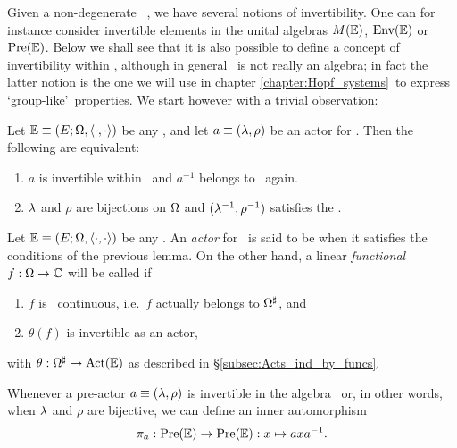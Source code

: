 Given a non-degenerate \context\ \EE, we have several notions
of invertibility. One can for instance consider invertible elements
in the unital algebras $M(\mathbb{E})$, $\mbox{\rm Env}(\mathbb{E})$ or $\mbox{\rm Pre}(\mathbb{E})$\@.
Below we shall see that it is also possible to define a concept of invertibility within \ActE,
although in general \ActE\ is not really an algebra;
in fact the latter notion is the one we will use in
chapter \ref{chapter:Hopf_systems}\ to express \lq group-like\rq\
properties. We start however with a trivial observation:

\begin{lemma} \label{lem:EE-invertibility}
  Let\/ $\mathbb{E} \equiv (E; \Omega, \langle\cdot, \cdot\rangle)$ be any \context, and let\/ $a\equiv(\lambda,\rho)$
  be an actor for\/ \EE\@. Then the following are equivalent:
  \begin{enumerate}
    \item $a$ is invertible within\/ \PreE\ and $a^{-1}$ belongs to \ActE\ again.
    \item $\lambda$ and $\rho$ are bijections on\/ $\Omega$ and\/
          $(\lambda^{-1},\rho^{-1})$ satisfies the \biap.
  \end{enumerate}
\end{lemma}


\begin{defn} \label{def:EE-invertibility}
  Let\/ $\mathbb{E} \equiv (E; \Omega, \langle\cdot, \cdot\rangle)$ be any \context\@.
  An {\em actor\/} for\/ \EE\ is said to be 
  when it satisfies the conditions of the previous lemma. On the other hand,
  a linear {\em functional\/} $f:\Omega\rightarrow \mathbb{C}$ will be called  if
  \begin{enumerate}
    \item $f$ is \stricta\ continuous,
          i.e.\ $f$ actually belongs to $\Omega^\sharp$, and
    \item $\theta(f)$ is \EEdash invertible as an actor,
  \end{enumerate}
  with $\theta: \Omega^\sharp \rightarrow \mbox{\rm Act}(\mathbb{E})$ as described in \S \ref{subsec:Acts_ind_by_funcs}.
\end{defn}

Whenever a pre-actor $a\equiv(\lambda,\rho)$ is invertible in the algebra \PreE\
or, in other words, when $\lambda$ and $\rho$ are bijective, we can define an
inner automorphism
$$  \pi_a : \mbox{\rm Pre}(\mathbb{E}) \rightarrow \mbox{\rm Pre}(\mathbb{E}) : x \mapsto axa^{-1}.  $$



